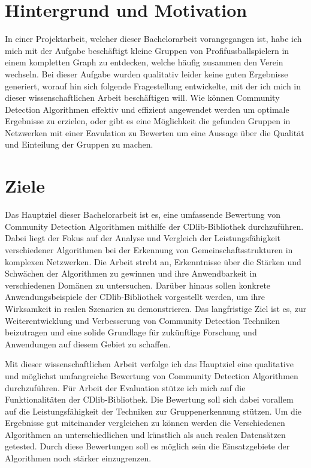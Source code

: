 \section{Hintergrund und Motivation}\label{Hintergrund und Motivation}
In einer Projektarbeit, welcher dieser Bachelorarbeit vorangegangen ist, habe ich mich mit der Aufgabe beschäftigt kleine Gruppen von Profifussballspielern in  einem kompletten Graph zu entdecken, welche häufig zusammen den Verein wechseln. Bei dieser Aufgabe wurden qualitativ leider keine guten Ergebnisse generiert, worauf hin sich folgende Fragestellung  entwickelte, mit der ich mich in dieser wissenschaftlichen Arbeit beschäftigen will. Wie können Community Detection Algorithmen effektiv und effizient angewendet werden um optimale Ergebnisse zu erzielen, oder gibt es eine Möglichkeit die gefunden Gruppen in Netzwerken mit einer Eavulation zu Bewerten um eine Aussage über die Qualität und Einteilung der Gruppen zu machen.

\section{Ziele}\label{Ziele}
Das Hauptziel dieser Bachelorarbeit ist es, eine umfassende Bewertung von Community Detection Algorithmen mithilfe der CDlib-Bibliothek durchzuführen. Dabei liegt der Fokus auf der Analyse und Vergleich der Leistungsfähigkeit verschiedener Algorithmen bei der Erkennung von Gemeinschaftsstrukturen in komplexen Netzwerken. Die Arbeit strebt an, Erkenntnisse über die Stärken und Schwächen der Algorithmen zu gewinnen und ihre Anwendbarkeit in verschiedenen Domänen zu untersuchen. Darüber hinaus sollen konkrete Anwendungsbeispiele der CDlib-Bibliothek vorgestellt werden, um ihre Wirksamkeit in realen Szenarien zu demonstrieren. Das langfristige Ziel ist es, zur Weiterentwicklung und Verbesserung von Community Detection Techniken beizutragen und eine solide Grundlage für zukünftige Forschung und Anwendungen auf diesem Gebiet zu schaffen.

Mit dieser wissenschaftlichen Arbeit verfolge ich das Hauptziel eine qualitative und möglichst umfangreiche Bewertung von Community Detection Algorithmen durchzuführen. Für Arbeit der Evaluation stütze ich mich auf die Funktionalitäten der CDlib-Bibliothek. Die Bewertung soll sich dabei vorallem auf die Leistungsfähigkeit der Techniken zur Gruppenerkennung stützen. Um die Ergebnisse gut miteinander vergleichen zu können werden die Verschiedenen Algorithmen an unterschiedlichen und künstlich als auch realen Datensätzen getested. Durch diese Bewertungen soll es möglich sein die Einsatzgebiete der Algorithmen noch stärker einzugrenzen.

